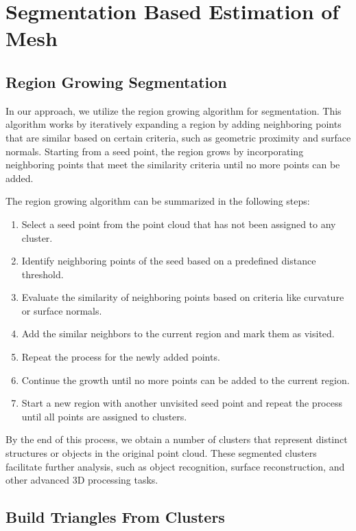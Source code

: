 \documentclass[11pt, a4paper,oneside,chapterprefix=false]{scrbook}
\begin{document}
\section{Segmentation Based Estimation of Mesh} \label{sec:region growing mesh estimation}


\subsection{Region Growing Segmentation}

In our approach, we utilize the region growing algorithm for segmentation. This algorithm works by iteratively expanding a region by adding neighboring points that are similar based on certain criteria, such as geometric proximity and surface normals. Starting from a seed point, the region grows by incorporating neighboring points that meet the similarity criteria until no more points can be added.

The region growing algorithm can be summarized in the following steps:
\begin{enumerate}
    \item Select a seed point from the point cloud that has not been assigned to any cluster.
    \item Identify neighboring points of the seed based on a predefined distance threshold.
    \item Evaluate the similarity of neighboring points based on criteria like curvature or surface normals.
    \item Add the similar neighbors to the current region and mark them as visited.
    \item Repeat the process for the newly added points.
    \item Continue the growth until no more points can be added to the current region.
    \item Start a new region with another unvisited seed point and repeat the process until all points are assigned to clusters.
\end{enumerate}

By the end of this process, we obtain a number of clusters that represent distinct structures or objects in the original point cloud. These segmented clusters facilitate further analysis, such as object recognition, surface reconstruction, and other advanced 3D processing tasks.


\subsection{Build Triangles From Clusters}
\end{document}
